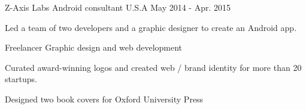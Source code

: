 


\begin{cventries}


\cventry
{Z-Axis Labs} %
{Android consultant} %
{U.S.A} %
{May 2014 - Apr. 2015} %
{ %
\begin{cvitems}
\item {Led a team of two developers and a graphic designer to create an Android app.}
\end{cvitems}
}


\cventry
{Freelancer} %
{Graphic design and web development} %
{} %
{} %
{ %
\begin{cvitems}
\item {Curated award-winning logos and created web / brand identity for more than 20 startups.}
\item {Designed two book covers for Oxford University Press}
\end{cvitems}
}


\end{cventries}
